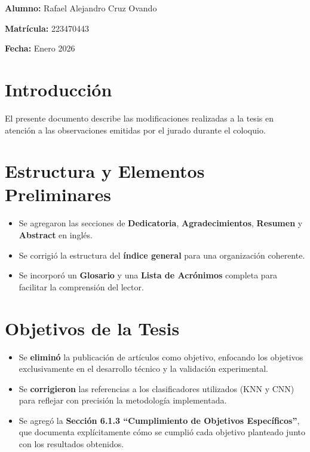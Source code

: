 \documentclass[12pt,letterpaper]{article}
\begin{document}
\vspace{0.8cm}
\noindent\textbf{Alumno:} Rafael Alejandro Cruz Ovando

\noindent\textbf{Matrícula:} 223470443

\noindent\textbf{Fecha:} Enero 2026

\vspace{0.6cm}

\section*{Introducción}

El presente documento describe las modificaciones realizadas a la tesis en atención a las observaciones emitidas por el jurado durante el coloquio.
\section{Estructura y Elementos Preliminares}

\begin{itemize}[leftmargin=*, itemsep=0.3em]
    \item Se agregaron las secciones de \textbf{Dedicatoria}, \textbf{Agradecimientos}, \textbf{Resumen} y \textbf{Abstract} en inglés.
    \item Se corrigió la estructura del \textbf{índice general} para una organización coherente.
    \item Se incorporó un \textbf{Glosario} y una \textbf{Lista de Acrónimos} completa para facilitar la comprensión del lector.
\end{itemize}

\section{Objetivos de la Tesis}

\begin{itemize}[leftmargin=*, itemsep=0.3em]
    \item Se \textbf{eliminó} la publicación de artículos como objetivo, enfocando los objetivos exclusivamente en el desarrollo técnico y la validación experimental.
    \item Se \textbf{corrigieron} las referencias a los clasificadores utilizados (KNN y CNN) para reflejar con precisión la metodología implementada.
    \item Se agregó la \textbf{Sección 6.1.3 ``Cumplimiento de Objetivos Específicos''}, que documenta explícitamente cómo se cumplió cada objetivo planteado junto con los resultados obtenidos.
\end{itemize}
\end{document}
